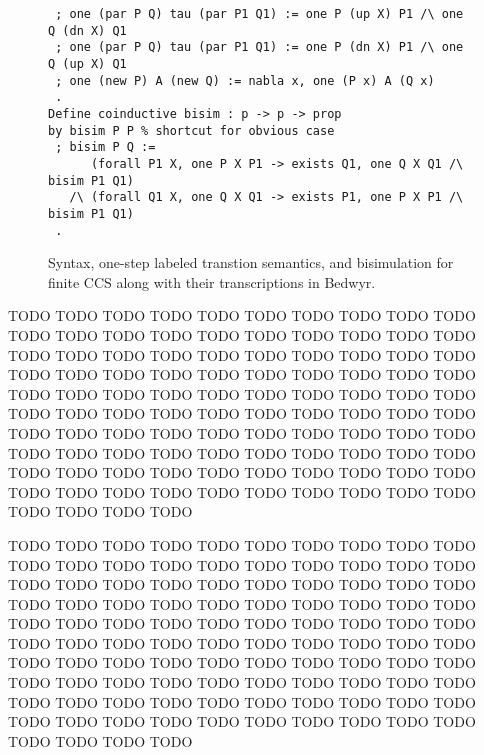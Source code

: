 \documentclass{llncs}
\begin{document}
\begin{figure}
\begin{verbatim}
 ; one (par P Q) tau (par P1 Q1) := one P (up X) P1 /\ one Q (dn X) Q1
 ; one (par P Q) tau (par P1 Q1) := one P (dn X) P1 /\ one Q (up X) Q1
 ; one (new P) A (new Q) := nabla x, one (P x) A (Q x)
 .
Define coinductive bisim : p -> p -> prop
by bisim P P % shortcut for obvious case
 ; bisim P Q :=
      (forall P1 X, one P X P1 -> exists Q1, one Q X Q1 /\ bisim P1 Q1)
   /\ (forall Q1 X, one Q X Q1 -> exists P1, one P X P1 /\ bisim P1 Q1)
 .
\end{verbatim}
\vspace*{-3ex}
\caption{Syntax, one-step labeled transtion semantics, and bisimulation
  for finite CCS along with their transcriptions in Bedwyr.}
\label{fig:ccsdef}
\end{figure}

TODO TODO TODO TODO TODO TODO TODO TODO TODO TODO TODO TODO TODO
TODO TODO TODO TODO TODO TODO TODO TODO TODO TODO TODO TODO TODO
TODO TODO TODO TODO TODO TODO TODO TODO TODO TODO TODO TODO TODO
TODO TODO TODO TODO TODO TODO TODO TODO TODO TODO TODO TODO TODO
TODO TODO TODO TODO TODO TODO TODO TODO TODO TODO TODO TODO TODO
TODO TODO TODO TODO TODO TODO TODO TODO TODO TODO TODO TODO TODO
TODO TODO TODO TODO TODO TODO TODO TODO TODO TODO TODO TODO TODO
TODO TODO TODO TODO TODO TODO TODO TODO TODO TODO TODO TODO TODO

TODO TODO TODO TODO TODO TODO TODO TODO TODO TODO TODO TODO TODO
TODO TODO TODO TODO TODO TODO TODO TODO TODO TODO TODO TODO TODO
TODO TODO TODO TODO TODO TODO TODO TODO TODO TODO TODO TODO TODO
TODO TODO TODO TODO TODO TODO TODO TODO TODO TODO TODO TODO TODO
TODO TODO TODO TODO TODO TODO TODO TODO TODO TODO TODO TODO TODO
TODO TODO TODO TODO TODO TODO TODO TODO TODO TODO TODO TODO TODO
TODO TODO TODO TODO TODO TODO TODO TODO TODO TODO TODO TODO TODO
TODO TODO TODO TODO TODO TODO TODO TODO TODO TODO TODO TODO TODO
\end{document}
